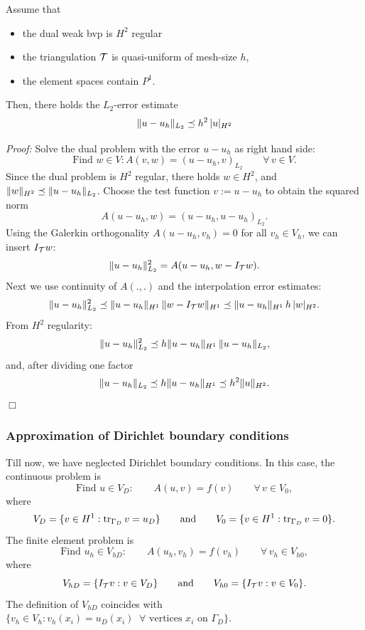 \begin{theorem} Assume that 
\begin{itemize}
\item the dual weak bvp is $H^2$ regular
\item the triangulation ${\cal T}$ is quasi-uniform of mesh-size $h$,
\item the element spaces contain $P^1$.
\end{itemize}
Then, there holds the $L_2$-error estimate
$$
\| u - u_h \|_{L_2} \preceq h^2 \, | u |_{H^2}
$$
\end{theorem}
{\em Proof:} 
Solve the dual problem with the error $u - u_h$ as right hand side:
$$
\mbox{Find } w \in V : A(v,w) = (u-u_h, v)_{L_2} \qquad \forall \, v \in V.
$$
Since the dual problem is $H^2$ regular, there holds $w\in H^2$, and $\| w \|_{H^2} \preceq \| u-u_h \|_{L_2}$. Choose the test function $v := u - u_h$ to obtain the squared norm
$$
A(u-u_h, w) = (u-u_h, u-u_h)_{L_2}.
$$
Using the Galerkin orthogonality $A(u-u_h, v_h) = 0$ for all $v_h \in V_h$, we can insert $I_{\cal T} w$:
$$
\| u - u_h \|_{L_2}^2 = A(u-u_h, w-I_{\cal T} w).
$$
Next we use continuity of $A(.,.)$ and the interpolation error estimates:
$$
\| u - u_h \|_{L_2}^2 \preceq \| u - u_h \|_{H^1} \, \| w - I_{\cal T} w \|_{H^1}
        \preceq \| u - u_h \|_{H^1} \, h \, | w  |_{H^2}.
$$
From $H^2$ regularity:
$$
\| u - u_h \|_{L_2}^2 \preceq h \| u - u_h \|_{H^1} \, \| u - u_h \|_{L_2},
$$
and, after dividing one factor
$$
\| u - u_h \|_{L_2} \preceq h \| u - u_h \|_{H^1} \preceq h^2 \| u \|_{H^2}.
$$
\hfill $\Box$
\bigskip


\subsubsection{Approximation of Dirichlet boundary conditions}
Till now, we have neglected Dirichlet boundary conditions. In this case, the continuous problem is
$$
\mbox{Find } u \in V_D : \qquad A(u,v) = f(v) \qquad \forall \, v \in V_0,
$$
where
$$
V_D = \{ v \in H^1 : \operatorname{tr}_{\Gamma_D} v = u_D \} \qquad \mbox{and} \qquad
V_0 = \{ v \in H^1 : \operatorname{tr}_{\Gamma_D} v = 0 \}.
$$
The finite element problem is
$$
\mbox{Find } u_h \in V_{hD} : \qquad A(u_h,v_h) = f(v_h) \qquad \forall \, v_h \in V_{h0},
$$
where
$$
V_{hD} = \{ I_{\cal T} v : v \in V_D \} \qquad \mbox{and} \qquad
V_{h0} = \{ I_{\cal T} v : v \in V_0 \}.
$$
The definition of $V_{hD}$ coincides with
$
\{ v_h \in V_h : v_h(x_i) = u_D(x_i) \; \; \forall \mbox{ vertices } x_i \mbox{ on } \Gamma_D \}.
$

